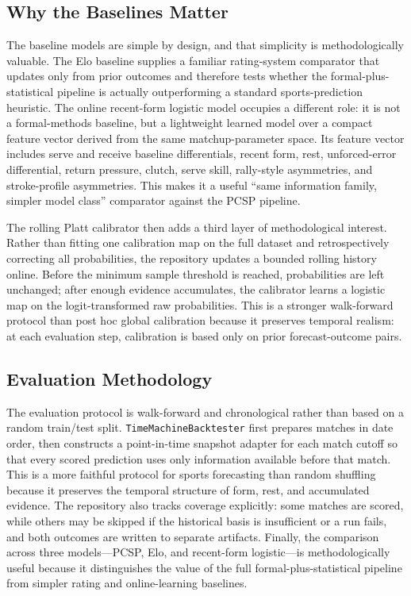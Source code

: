 \documentclass{article}
\begin{document}
\subsection*{Why the Baselines Matter}
The baseline models are simple by design, and that simplicity is methodologically valuable. The Elo baseline supplies a familiar rating-system comparator that updates only from prior outcomes and therefore tests whether the formal-plus-statistical pipeline is actually outperforming a standard sports-prediction heuristic. The online recent-form logistic model occupies a different role: it is not a formal-methods baseline, but a lightweight learned model over a compact feature vector derived from the same matchup-parameter space. Its feature vector includes serve and receive baseline differentials, recent form, rest, unforced-error differential, return pressure, clutch, serve skill, rally-style asymmetries, and stroke-profile asymmetries. This makes it a useful ``same information family, simpler model class'' comparator against the PCSP pipeline.

The rolling Platt calibrator then adds a third layer of methodological interest. Rather than fitting one calibration map on the full dataset and retrospectively correcting all probabilities, the repository updates a bounded rolling history online. Before the minimum sample threshold is reached, probabilities are left unchanged; after enough evidence accumulates, the calibrator learns a logistic map on the logit-transformed raw probabilities. This is a stronger walk-forward protocol than post hoc global calibration because it preserves temporal realism: at each evaluation step, calibration is based only on prior forecast-outcome pairs.

\subsection*{Evaluation Methodology}
The evaluation protocol is walk-forward and chronological rather than based on a random train/test split. \texttt{TimeMachineBacktester} first prepares matches in date order, then constructs a point-in-time snapshot adapter for each match cutoff so that every scored prediction uses only information available before that match. This is a more faithful protocol for sports forecasting than random shuffling because it preserves the temporal structure of form, rest, and accumulated evidence. The repository also tracks coverage explicitly: some matches are scored, while others may be skipped if the historical basis is insufficient or a run fails, and both outcomes are written to separate artifacts. Finally, the comparison across three models---PCSP, Elo, and recent-form logistic---is methodologically useful because it distinguishes the value of the full formal-plus-statistical pipeline from simpler rating and online-learning baselines.
\end{document}
